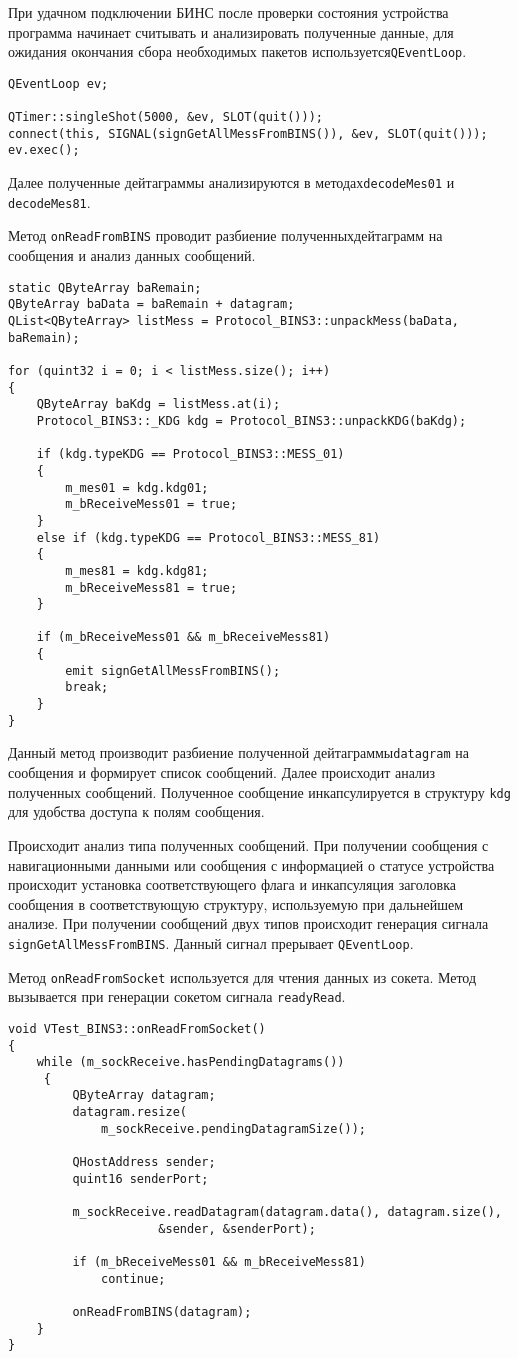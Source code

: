 При удачном подключении БИНС после проверки состояния устройства программа начинает считывать и анализировать полученные
данные, для ожидания окончания сбора необходимых пакетов используется\break \texttt{QEventLoop}.
\medskip
\begin{verbatim}
QEventLoop ev;

QTimer::singleShot(5000, &ev, SLOT(quit()));
connect(this, SIGNAL(signGetAllMessFromBINS()), &ev, SLOT(quit()));
ev.exec();
\end{verbatim}
\medskip

Далее полученные дейтаграммы анализируются в методах\break \texttt{decodeMes01} и \texttt{decodeMes81}.

Метод \texttt{onReadFromBINS} проводит разбиение полученных\break дейтаграмм на сообщения и анализ данных сообщений.
\medskip
\begin{verbatim}
static QByteArray baRemain;
QByteArray baData = baRemain + datagram;
QList<QByteArray> listMess = Protocol_BINS3::unpackMess(baData, baRemain);

for (quint32 i = 0; i < listMess.size(); i++)
{
	QByteArray baKdg = listMess.at(i);
	Protocol_BINS3::_KDG kdg = Protocol_BINS3::unpackKDG(baKdg);

	if (kdg.typeKDG == Protocol_BINS3::MESS_01)
	{
		m_mes01 = kdg.kdg01;
		m_bReceiveMess01 = true;
	}
	else if (kdg.typeKDG == Protocol_BINS3::MESS_81)
	{
		m_mes81 = kdg.kdg81;
		m_bReceiveMess81 = true;
	}

	if (m_bReceiveMess01 && m_bReceiveMess81)
	{
		emit signGetAllMessFromBINS();
		break;
	}
}
\end{verbatim}
\medskip

Данный метод производит разбиение полученной дейтаграммы\break \texttt{datagram} на сообщения и формирует список сообщений.
Далее происходит анализ полученных сообщений. Полученное сообщение инкапсулируется в структуру \texttt{kdg} для удобства
доступа к полям сообщения.

Происходит анализ типа полученных сообщений. При получении сообщения с навигационными данными или сообщения с
информацией о статусе устройства происходит установка соответствующего флага и инкапсуляция заголовка сообщения в
соответствующую структуру, используемую при дальнейшем анализе. При получении сообщений двух типов происходит генерация
сигнала \texttt{signGetAllMessFromBINS}. Данный сигнал прерывает \texttt{QEventLoop}.

Метод \texttt{onReadFromSocket} используется для чтения данных из сокета. Метод вызывается при генерации сокетом сигнала
\texttt{readyRead}.
\medskip
\begin{verbatim}
void VTest_BINS3::onReadFromSocket()
{
	while (m_sockReceive.hasPendingDatagrams())
	 {
		 QByteArray datagram;
		 datagram.resize(
			 m_sockReceive.pendingDatagramSize());

		 QHostAddress sender;
		 quint16 senderPort;

		 m_sockReceive.readDatagram(datagram.data(), datagram.size(),
					 &sender, &senderPort);

		 if (m_bReceiveMess01 && m_bReceiveMess81)
			 continue;

		 onReadFromBINS(datagram);
	}
}
\end{verbatim}
\medskip

